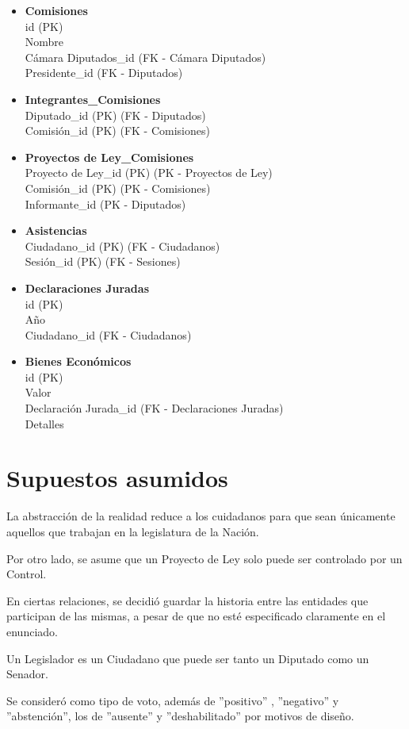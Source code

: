 \begin{itemize}
 	\item \textbf{Comisiones} \\
 	id (PK) \\
 	Nombre \\
 	Cámara Diputados\_id (FK - Cámara Diputados) \\
 	Presidente\_id (FK - Diputados)
 	
	\item \textbf{Integrantes\_Comisiones} \\
	Diputado\_id (PK) (FK - Diputados) \\
	Comisión\_id (PK) (FK - Comisiones) 
	
	\item \textbf{Proyectos de Ley\_Comisiones} \\
	Proyecto de Ley\_id (PK) (PK - Proyectos de Ley) \\
	Comisión\_id (PK) (PK - Comisiones) \\
	Informante\_id (PK - Diputados)
	
	
	\item \textbf{Asistencias} \\
	Ciudadano\_id (PK) (FK - Ciudadanos) \\
	Sesión\_id (PK) (FK - Sesiones)
	
	\item \textbf{Declaraciones Juradas} \\
	id (PK) \\
	Año \\
	Ciudadano\_id (FK - Ciudadanos)
	
	\item \textbf{Bienes Económicos} \\
	id (PK) \\
	Valor \\
	Declaración Jurada\_id (FK - Declaraciones Juradas) \\
	Detalles \\ 
	
\end{itemize}

\newpage

\section{Supuestos asumidos}
La abstracción de la realidad reduce a los cuidadanos para que sean únicamente aquellos que trabajan en la legislatura de la Nación.


Por otro lado, se asume que un Proyecto de Ley solo puede ser controlado por un Control. 


En ciertas relaciones, se decidió guardar la historia entre las entidades que participan de las mismas, a pesar de que no esté especificado claramente en el enunciado.


Un Legislador es un Ciudadano que puede ser tanto un Diputado como un Senador.


Se consideró como tipo de voto, además de ''positivo'' , ''negativo'' y ''abstención'', los de ''ausente'' y ''deshabilitado'' por motivos de diseño.